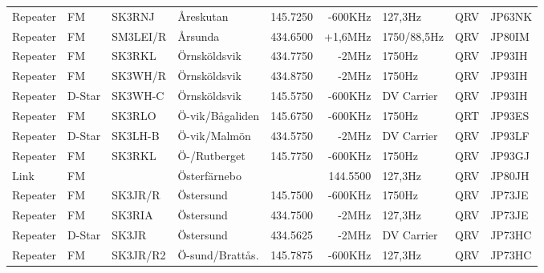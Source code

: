 \begin{landscape}
\begin{longtable}{llllrrlcl}
	Repeater          & FM           & SK3RNJ        & Åreskutan        &          145.7250 &        -600KHz & 127,3Hz         &       QRV       & JP63NK           \\
	Repeater          & FM           & SM3LEI/R      & Årsunda          &          434.6500 &        +1,6MHz & 1750/88,5Hz     &       QRV       & JP80IM           \\
	Repeater          & FM           & SK3RKL        & Örnsköldsvik     &          434.7750 &          -2MHz & 1750Hz          &       QRV       & JP93IH           \\
	Repeater          & FM           & SK3WH/R       & Örnsköldsvik     &          434.8750 &          -2MHz & 1750Hz          &       QRV       & JP93IH           \\
	Repeater          & D-Star       & SK3WH-C       & Örnsköldsvik     &          145.5750 &        -600KHz & DV Carrier      &       QRV       & JP93IH           \\
	Repeater          & FM           & SK3RLO        & Ö-vik/Bågaliden  &          145.6750 &        -600KHz & 1750Hz          &       QRT       & JP93ES           \\
	Repeater          & D-Star       & SK3LH-B       & Ö-vik/Malmön     &          434.5750 &          -2MHz & DV Carrier      &       QRV       & JP93LF           \\
	Repeater          & FM           & SK3RKL        & Ö-/Rutberget     &          145.7750 &        -600KHz & 1750Hz          &       QRV       & JP93GJ           \\
	Link              & FM           &               & Österfärnebo     &                   &       144.5500 & 127,3Hz         &       QRV       & JP80JH           \\
	Repeater          & FM           & SK3JR/R       & Östersund        &          145.7500 &        -600KHz & 1750Hz          &       QRV       & JP73JE           \\
	Repeater          & FM           & SK3RIA        & Östersund        &          434.7500 &          -2MHz & 127,3Hz         &       QRV       & JP73JE           \\
	Repeater          & D-Star       & SK3JR         & Östersund        &          434.5625 &          -2MHz & DV Carrier      &       QRV       & JP73HC           \\
	Repeater          & FM           & SK3JR/R2      & Ö-sund/Brattås.  &          145.7875 &        -600KHz & 127,3Hz         &       QRV       & JP73HC
\end{longtable}
\normalsize

\end{landscape}
